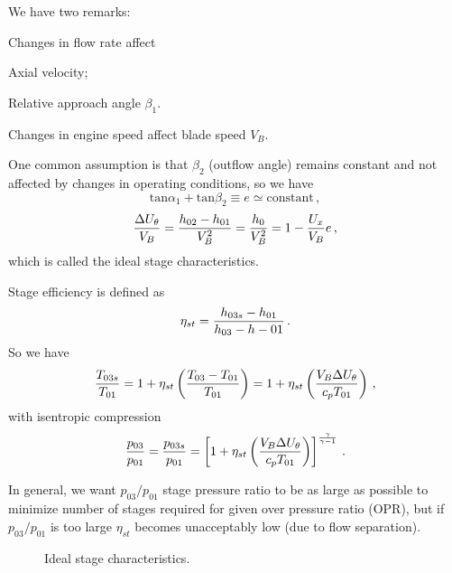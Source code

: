 We have two remarks:
\begin{itemizePacked}
\item Changes in flow rate affect
  \begin{itemizePacked}
  \item Axial velocity;
  \item Relative approach angle $\beta_1$.
  \end{itemizePacked}
\item Changes in engine speed affect blade speed $V_B$.
\end{itemizePacked}

One common assumption is that $\beta_2$ (outflow angle) remains constant and not affected by changes in operating conditions, so we have
\begin{equation}
  \text{tan} \alpha_1 + \text{tan} \beta_2 \equiv e \simeq \text{constant}\,,
\end{equation}
\begin{equation}
  {\frac{\Delta U_\theta}{V_B}} = {\frac{h_{02} - h_{01}}{V_B^2}} = {\frac{h_{0}}{V_B^2}} = 1 - {\frac{U_x}{V_B}} e \,,
\end{equation}
which is called the ideal stage characteristics.

Stage efficiency is defined as
\begin{equation}
  \eta_{st} = {\frac{h_{03s}-h_{01}}{h_{03}-h-{01}}}\,.
\end{equation}
So we have
\begin{equation}
  {\frac{T_{03s}}{T_{01}}} = 1 + \eta_{st} \left({\frac{T_{03}-T_{01}}{T_{01}}}\right) = 1 + \eta_{st} \left({\frac{V_B \Delta U_\theta}{c_p T_{01}}}\right) \,,
\end{equation}
with isentropic compression
\begin{equation}
  {\frac{p_{03}}{p_{01}}} = {\frac{p_{03s}}{p_{01}}} = \left[1 + \eta_{st}  \left({\frac{V_B \Delta U_\theta}{c_p T_{01}}}\right) \right]^{{\frac{\gamma}{\gamma-1}}} \,.
\end{equation}

In general, we want $p_{03}/p_{01}$ stage pressure ratio to be as large as possible to minimize number of stages required for given over pressure ratio (OPR), but if $p_{03}/p_{01}$ is too large $\eta_{st}$ becomes unacceptably low (due to flow separation).

\begin{figure}[!htb!]
 \centering
    \quad
    \caption{\label{FIG_TURBO_DESIGN}Ideal stage characteristics.}
\end{figure}

